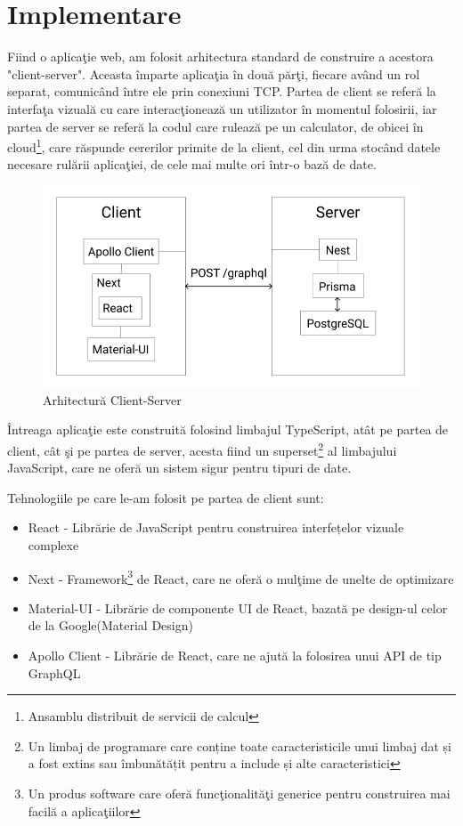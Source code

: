 \documentclass[12pt, a4paper, oneside, romanian]{teza-upb}
\begin{document}
\chapter{Implementare}

Fiind o aplicaţie web, am folosit arhitectura standard de construire a acestora "client-server". Aceasta împarte aplicaţia în două părţi, fiecare având un rol separat, comunicând între ele prin conexiuni TCP. Partea de client se referă la interfaţa vizuală cu care interacţionează un utilizator în momentul folosirii, iar partea de server se referă la codul care rulează pe un calculator, de obicei în cloud\footnote{Ansamblu distribuit de servicii de calcul}, care răspunde cererilor primite de la client, cel din urma stocând datele necesare rulării aplicaţiei, de cele mai multe ori într-o bază de date.\cite{arhitecturaclientserver}

\begin{figure}[H]
\centering
\includegraphics*[width=0.7\columnwidth]{arhitectura-client-server}
\caption{Arhitectură Client-Server}
\label{arhitectura-client-server}
\end{figure}

Întreaga aplicaţie este construită folosind limbajul TypeScript, atât pe partea de client, cât şi pe partea de server, acesta fiind un superset\footnote{Un limbaj de programare care conține toate caracteristicile unui limbaj dat și a fost extins sau îmbunătățit pentru a include și alte caracteristici} al limbajului JavaScript, care ne oferă un sistem sigur pentru tipuri de date.\cite{documentatietypescript}

Tehnologiile pe care le-am folosit pe partea de client sunt:
\begin{itemize}
	\item React\cite{documentatiereact} - Librărie de JavaScript pentru construirea interfețelor vizuale complexe
	\item Next\cite{documentatienext} - Framework\footnote{Un produs software care oferă funcţionalităţi generice pentru construirea mai facilă a aplicaţiilor} de React, care ne oferă o mulţime de unelte de optimizare
	\item Material-UI\cite{documentatiematerialui} - Librărie de componente UI de React, bazată pe design-ul celor de la Google(Material Design)
	\item Apollo Client\cite{documentatieapolloclient} - Librărie de React, care ne ajută la folosirea unui API de tip GraphQL
\end{itemize}
\end{document}
